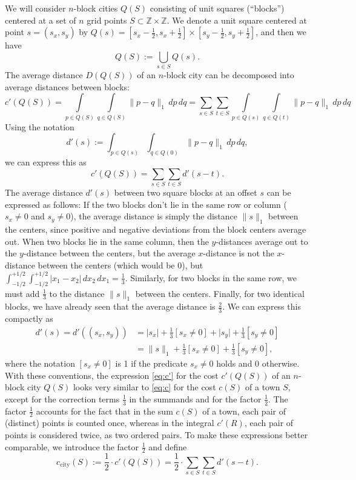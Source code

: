 \documentclass[preprint,authoryear,12pt]{elsarticle}
\newcommand{\abs}[1]{\lvert #1 \rvert}
\newcommand{\norm}[1]{\lVert #1 \rVert}
\begin{document}
We will consider $n$-block cities $Q(S)$ consisting of unit
squares (``blocks'') centered
at a set of $n$ grid points $S \subset \mathbb{Z} \times
\mathbb{Z}$.
We denote a unit square centered at point
$s=(s_x,s_y)$ by $Q(s) = [s_x-\frac12,s_x+\frac12]
\times [s_y-\frac12,s_y+\frac12]$, and then we have
$$Q(S) := \bigcup_{s\in S} Q(s).$$
The average distance $D(Q(S))$ of an $n$-block city can be decomposed
into average distances between blocks:
$$c'(Q(S))
=
\int\limits_{p\in Q(S)}
\int\limits_{q\in Q(S)} \norm{p-q}_1\, dp\, dq
=
\sum_{s \in S}
\sum_{t \in S}
\int\limits_{p\in Q(s)}
\int\limits_{q\in Q(t)} \norm{p-q}_1\, dp\, dq
$$
Using the notation
$$
d'(s) :=
\int_{p\in Q(s)}
\int_{q\in Q(0)} \norm{p-q}_1\, dp\, dq
,$$
we can express this as
\begin{equation}
  \label{eq:c'}
c'(Q(S))
=
\sum_{s \in S}
\sum_{t \in S}
d'(s-t)
.
\end{equation}
The average distance $d'(s)$ between two square
blocks at an offset $s$ can be expressed as follows: If the two blocks
don't lie in the same row or column ($s_x\ne0$ and $s_y\ne0$), the
average distance is simply the distance $\norm s _1$ between the
centers, since positive and negative
deviations from the block centers average out.
When two blocks lie in the same column, then the $y$-distances
average out to the $y$-distance between the centers, but the average $x$-distance is not the
$x$-distance between the centers (which would be 0), but
$
\int_{-1/2}^{+1/2}
\int_{-1/2}^{+1/2}
 |x_1-x_2|\, dx_2 \,dx_1 =\frac13$.
Similarly, for two blocks in the same row, we must add $\frac13$ to
the distance $\norm s _1$ between the centers. Finally, for two
identical blocks, we have already seen that the average distance is
$\frac23$. We can express this compactly as
\begin{align*}
d'(s) = d'((s_x,s_y))
&=
\abs {s_x} + \tfrac13[s_x\ne 0]
+
\abs {s_y} + \tfrac13[s_y\ne 0]
\\&
=
\norm s _1 + \tfrac13[s_x\ne 0]
+\tfrac13[s_y\ne 0]
,
\end{align*}
where the notation $[s_x\ne 0]$ is 1 if the predicate
$s_x\ne 0$ holds and 0 otherwise.
With these conventions, the expression
\eqref{eq:c'}
for the cost $c'(Q(S))$ of an $n$-block city $Q(S)$
looks very similar
to
\eqref{eq:c}
for the cost $c(S)$ of a town $S$,
except for
the correction terms $\frac 13$ in the summands and for the factor
$\frac12$.
The factor $\frac12$ accounts for the fact that in the sum $c(S)$ of a
town, each {pair} of (distinct) points is counted once, whereas in the
integral $c'(R)$, each pair of points is considered twice, as two
ordered pairs.
To make these expressions better comparable, we introduce the factor
$\frac12$ and define \begin{equation}
\nonumber c_{\mathrm{city}}
(S) :=
\frac 12 \cdot c'(Q(S))
=
\frac12\cdot
\sum_{s \in S}
\sum_{t \in S}
d'(s-t)
.
\end{equation}
\end{document}
